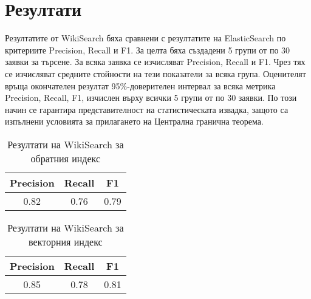 \documentclass[a4paper,12pt]{article} \usepackage[utf8]{inputenc}
\begin{document}
\section{Резултати} Резултатите от WikiSearch бяха сравнени с резултатите на
ElasticSearch по критериите Precision, Recall и F1. За целта бяха създадени 5
групи от по 30 заявки за търсене. За всяка заявка се изчисляват Precision,
Recall и F1. Чрез тях се изчисляват средните стойности на тези показатели за
всяка група. Оценителят връща окончателен резултат 95\%-доверителен интервал за
всяка метрика Precision, Recall, F1, изчислен върху всички 5 групи от по 30
заявки. По този начин се гарантира представителност на статистическата извадка,
защото са изпълнени условията за прилагането на Централна гранична теорема.

\begin{table}[h] \centering \begin{tabular}{|c|c|c|} \hline Precision & Recall
& F1 \\ \hline 0.82 & 0.76 & 0.79 \\ \hline \end{tabular} \caption{Резултати на
WikiSearch за обратния индекс} \end{table}

\begin{table}[h] \centering \begin{tabular}{|c|c|c|} \hline Precision & Recall
& F1 \\ \hline 0.85 & 0.78 & 0.81 \\ \hline \end{tabular} \caption{Резултати на
WikiSearch за векторния индекс} \end{table}
\end{document}
